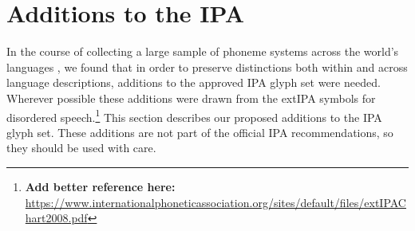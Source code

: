 \begin{comment}
\subsection{IPA (practical) extensions}

The IPA extensions cover speech sounds beyond the sound systems of the world's languages, including symbols for pathological speech and paralinguistic functions (e.g.\ Braille?).

- pathological speech
- paralinguistic functions (Braille?)

As noted in Section \ref{}, extensions to the IPA -- in particular ``large-scale'' extensions -- 

http://www.ruf.rice.edu/~reng/englebretson2009.pdf

X-SAMPA was an ASCII transliteration and is still purposeful for several programs 

There is also the extensions of the IPA designed for disordered speech, although the symbols are occasionally used for transcribing phonetic detail in ``normal'' speech or also cross-linguistic rarities.\footnote{\url{http://phoible.github.io/conventions/}}



https://www.phon.ucl.ac.uk/home/wells/ipa-unicode.htm

Computer codes for phonetic symbols
EslingGaylord1993

\end{comment}


\section{Additions to the IPA}
\label{ipa-additions}

In the course of collecting a large sample of phoneme systems across the world's
languages \citep{Moran2012}, we found that in order to preserve distinctions
both within and across language descriptions, additions to the approved IPA
glyph set were needed. Wherever possible these additions were drawn from the
extIPA symbols for disordered
speech.\footnote{\textbf{Add better reference here: }\url{https://www.internationalphoneticassociation.org/sites/default/files/extIPAChart2008.pdf}}
This section describes our proposed additions to the IPA glyph set. These
additions are not part of the official IPA recommendations, so they should be 
used with care.

